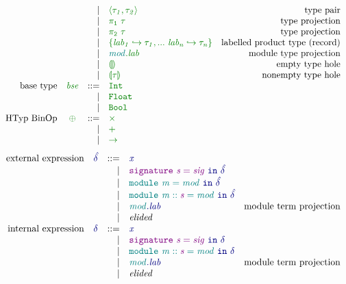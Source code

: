 \documentclass[12pt,fleqn]{article}
\newcommand{\green}[1]{\textcolor{green}{#1}}
\newcommand{\blue}[1]{\textcolor{blue}{#1}}
\newcommand{\purple}[1]{\textcolor{purple}{#1}}
\newcommand{\teal}[1]{\textcolor{teal}{#1}}
\newcommand{\greentt}[1]{\green{\mathtt{#1}}}
\newcommand{\bluett}[1]{\blue{\mathtt{#1}}}
\newcommand{\purplett}[1]{\purple{\mathtt{#1}}}
\newcommand{\tealtt}[1]{\teal{\mathtt{#1}}}
\newcommand{\greenit}[1]{\green{\mathit{#1}}}
\newcommand{\blueit}[1]{\blue{\mathit{#1}}}
\newcommand{\purpleit}[1]{\purple{\mathit{#1}}}
\newcommand{\tealit}[1]{\teal{\mathit{#1}}}
\newcommand{\typ}[1][]{\greenit{\tau#1}}
\newcommand{\uexp}[1][]{\blueit{\hat\delta#1}}
\newcommand{\uexpvar}[1][]{\blueit{x#1}}
\renewcommand{\exp}[1][]{\blueit{\delta#1}}
\newcommand{\expvar}[1][]{\blueit{x#1}}
\newcommand{\sig}[1][]{\purpleit{sig#1}}
\newcommand{\sigvar}[1][]{\purpleit{s#1}}
\renewcommand{\mod}[1][]{\tealit{mod#1}}
\newcommand{\modvar}[1][]{\tealit{m#1}}
\newcommand{\lab}[1][]{\mathit{lab#1}}
\newcommand{\TypCPair}[2]{\greentt{\langle #1, #2\rangle}}
\newcommand{\TypCPairPrjL}[1]{\greentt{\pi_1~#1}}
\newcommand{\TypCPairPrjR}[1]{\greentt{\pi_2~#1}}
\newcommand{\TypCHole}[1][]{\greentt{\llparenthesis #1 \rrparenthesis}}
\newcommand{\Int}{\greentt{Int}}
\newcommand{\Float}{\greentt{Float}}
\newcommand{\Bool}{\greentt{Bool}}
\newcommand{\LetSig}[2]{\purplett{signature~#1=#2}\bluett{~in~\exp}}
\newcommand{\uLetSig}[2]{\purplett{signature~#1=#2}\bluett{~in~\uexp}}
\newcommand{\ModTermPrj}[2]{\bluett{#1.#2}}
\newcommand{\uModTermPrj}[2]{\bluett{#1.#2}}
\newcommand{\LetMod}[2]{\tealtt{module~#1=#2}\bluett{~in~\exp}}
\newcommand{\uLetMod}[2]{\tealtt{module~#1=#2}\bluett{~in~\uexp}}
\begin{document}
\[\begin{array}{rcrlr}
                           && \vert & \TypCPair{\typ[_1]}{\typ[_2]} & \textrm{type pair} \\
                           && \vert & \TypCPairPrjL{\typ} & \textrm{type projection} \\
                           && \vert & \TypCPairPrjR{\typ} & \textrm{type projection} \\
                           && \vert & \greentt{\{\lab[_1] \hookrightarrow \typ[_1], ...~\lab[_n] \hookrightarrow \typ[_n]\}} & \textrm{labelled product type (record)} \\
                           && \vert & \greentt{\mod.\lab} & \textrm{module type projection} \\
                           && \vert & \TypCHole & \textrm{empty type hole} \\
                           && \vert & \TypCHole[\typ] & \textrm{nonempty type hole} \\
    \textrm{base type} & \greenit{bse} & ::=
                       & \Int \\
                       && \vert & \Float \\
                       && \vert & \Bool \\
    \textrm{HTyp BinOp} & \greenit{\oplus} & ::=
                   & \greentt{\times} \\
                   && \vert & \greentt{+} \\
                   && \vert & \greentt{\rightarrow}\\
\end{array}\]
\[\begin{array}{rcrlr}
    \textrm{external expression} & \uexp & ::=
                                 & \uexpvar \\
                                 && \vert & \uLetSig{\sigvar}{\sig} \\
                                 && \vert & \uLetMod{\modvar}{\mod} \\
                                 && \vert & \uLetMod{\modvar :: \sigvar}{\mod} \\
                                 && \vert & \uModTermPrj{\mod}{\lab} & \textrm{module term projection} \\
                                 && \vert & \textit{elided} \\
    \textrm{internal expression} & \exp & ::=
                                 & \expvar \\
                                 && \vert & \LetSig{\sigvar}{\sig} \\
                                 && \vert & \LetMod{\modvar :: \sigvar}{\mod} \\
                                 && \vert & \ModTermPrj{\mod}{\lab} & \textrm{module term projection} \\
                                 && \vert & \textit{elided} \\
\end{array}\]
\end{document}
